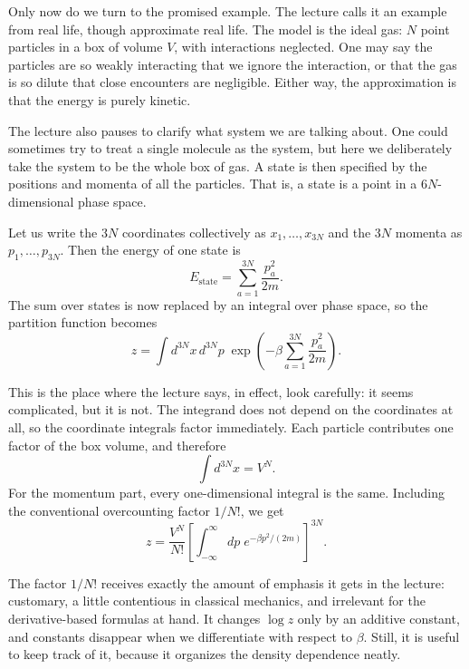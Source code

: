 Only now do we turn to the promised example. The lecture calls it an example from real life, though approximate real life. The model is the ideal gas: \(N\) point particles in a box of volume \(V\), with interactions neglected. One may say the particles are so weakly interacting that we ignore the interaction, or that the gas is so dilute that close encounters are negligible. Either way, the approximation is that the energy is purely kinetic.

The lecture also pauses to clarify what system we are talking about. One could sometimes try to treat a single molecule as the system, but here we deliberately take the system to be the whole box of gas. A state is then specified by the positions and momenta of all the particles. That is, a state is a point in a \(6N\)-dimensional phase space.

Let us write the \(3N\) coordinates collectively as \(x_1,\dots,x_{3N}\) and the \(3N\) momenta as \(p_1,\dots,p_{3N}\). Then the energy of one state is
\begin{equation}
E_{\mathrm{state}}=\sum_{a=1}^{3N}\frac{p_a^2}{2m}.
\end{equation}
The sum over states is now replaced by an integral over phase space, so the partition function becomes
\begin{equation}
z
=
\int d^{3N}x\,d^{3N}p\;
\exp\!\left(-\beta\sum_{a=1}^{3N}\frac{p_a^2}{2m}\right).
\end{equation}

This is the place where the lecture says, in effect, look carefully: it seems complicated, but it is not. The integrand does not depend on the coordinates at all, so the coordinate integrals factor immediately. Each particle contributes one factor of the box volume, and therefore
\begin{equation}
\int d^{3N}x = V^N.
\end{equation}
For the momentum part, every one-dimensional integral is the same. Including the conventional overcounting factor \(1/N!\), we get
\begin{equation}
z=\frac{V^N}{N!}\left[\int_{-\infty}^{\infty}dp\;e^{-\beta p^2/(2m)}\right]^{3N}.
\end{equation}

The factor \(1/N!\) receives exactly the amount of emphasis it gets in the lecture: customary, a little contentious in classical mechanics, and irrelevant for the derivative-based formulas at hand. It changes \(\log z\) only by an additive constant, and constants disappear when we differentiate with respect to \(\beta\). Still, it is useful to keep track of it, because it organizes the density dependence neatly.

